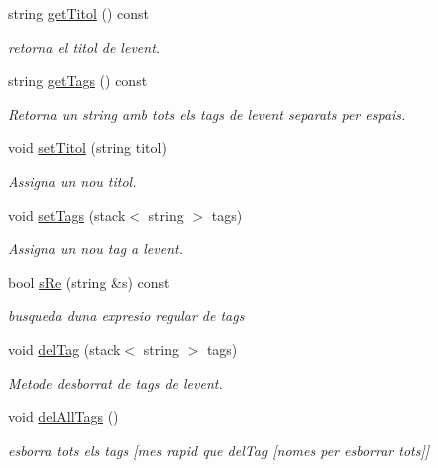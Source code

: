 \begin{DoxyCompactItemize}
\item 
string \hyperlink{class_event_a5a674a90725e7589757e98de7f109243}{get\+Titol} () const 
\begin{DoxyCompactList}\small\item\em retorna el titol de l\textquotesingle{}event. \end{DoxyCompactList}\item 
string \hyperlink{class_event_ad17c21131ed964fc3498689e9f7413b4}{get\+Tags} () const 
\begin{DoxyCompactList}\small\item\em Retorna un string amb tots els tags de l\textquotesingle{}event separats per espais. \end{DoxyCompactList}\item 
void \hyperlink{class_event_a16ed22cc72c0249ade170184f280a1d8}{set\+Titol} (string titol)
\begin{DoxyCompactList}\small\item\em Assigna un nou titol. \end{DoxyCompactList}\item 
void \hyperlink{class_event_a3f8e092c3f470034b0ae8273d8ec5cbb}{set\+Tags} (stack$<$ string $>$ tags)
\begin{DoxyCompactList}\small\item\em Assigna un nou tag a l\textquotesingle{}event. \end{DoxyCompactList}\item 
bool \hyperlink{class_event_a4262e77c2021435ab9f9535f0008c593}{s\+Re} (string \&s) const 
\begin{DoxyCompactList}\small\item\em busqueda d\textquotesingle{}una expresio regular de tags \end{DoxyCompactList}\item 
void \hyperlink{class_event_a7bd83fe91f68446aee88fd69bd9ee388}{del\+Tag} (stack$<$ string $>$ tags)
\begin{DoxyCompactList}\small\item\em Metode d\textquotesingle{}esborrat de tags de l\textquotesingle{}event. \end{DoxyCompactList}\item 
void \hyperlink{class_event_a58e213ecfa7b2beedc275a2b4dc86eaf}{del\+All\+Tags} ()
\begin{DoxyCompactList}\small\item\em esborra tots els tags \mbox{[}mes rapid que del\+Tag \mbox{[}nomes per esborrar tots\mbox{]}\mbox{]} \end{DoxyCompactList}\end{DoxyCompactItemize}


